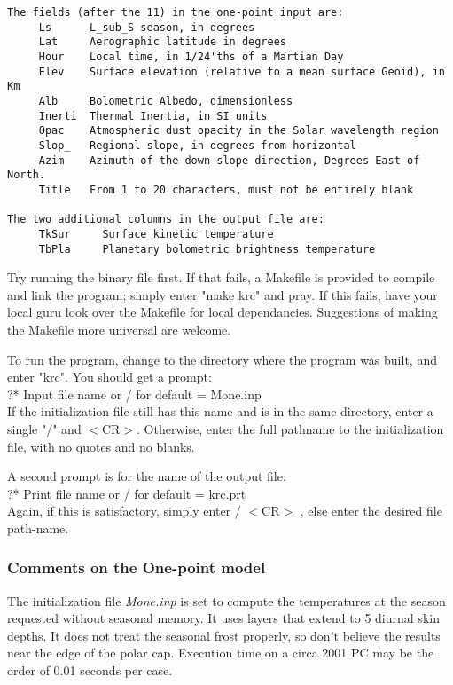 \documentclass[draft]{article}  %
\newcommand{\qi}{\\ \hspace*{2.em}}      %
\newcommand{\nf}{\textit}  %
\begin{document}
\vspace{-3.mm} 
\begin{verbatim}
The fields (after the 11) in the one-point input are:
     Ls      L_sub_S season, in degrees
     Lat     Aerographic latitude in degrees
     Hour    Local time, in 1/24'ths of a Martian Day
     Elev    Surface elevation (relative to a mean surface Geoid), in Km
     Alb     Bolometric Albedo, dimensionless
     Inerti  Thermal Inertia, in SI units
     Opac    Atmospheric dust opacity in the Solar wavelength region
     Slop_   Regional slope, in degrees from horizontal
     Azim    Azimuth of the down-slope direction, Degrees East of North.
     Title   From 1 to 20 characters, must not be entirely blank

The two additional columns in the output file are:
     TkSur     Surface kinetic temperature
     TbPla     Planetary bolometric brightness temperature
\end{verbatim}

Try running the binary file first. If that fails, a Makefile is provided to
compile and link the program; simply enter "make krc" and pray. If this fails,
have your local guru look over the Makefile for local dependancies. Suggestions
of making the Makefile more universal are welcome.

To run the program, change to the directory where the program was built, and
enter "krc". You should get a prompt:
 \qi      ?* Input file name or / for default = Mone.inp  \\
If the initialization file still has this name and is in the same directory,
enter a single "/" and $<$CR$>$. Otherwise, enter the full pathname to the 
initialization file, with no quotes and no blanks.

A second prompt is for the name of the output file: 
 \qi         ?* Print file name or / for default = krc.prt \\
Again, if this is satisfactory, simply enter  / $<$CR$>$ , else enter the desired
file path-name.

\subsubsection{ Comments on the One-point model} %

The initialization file \nf{Mone.inp} is set to compute the temperatures at the
season requested without seasonal memory. It uses layers that extend to 5
diurnal skin depths. It does not treat the seasonal frost properly, so don't
believe the results near the edge of the polar cap. Execution time on a circa
2001 PC may be the order of 0.01 seconds per case.
\end{document}
